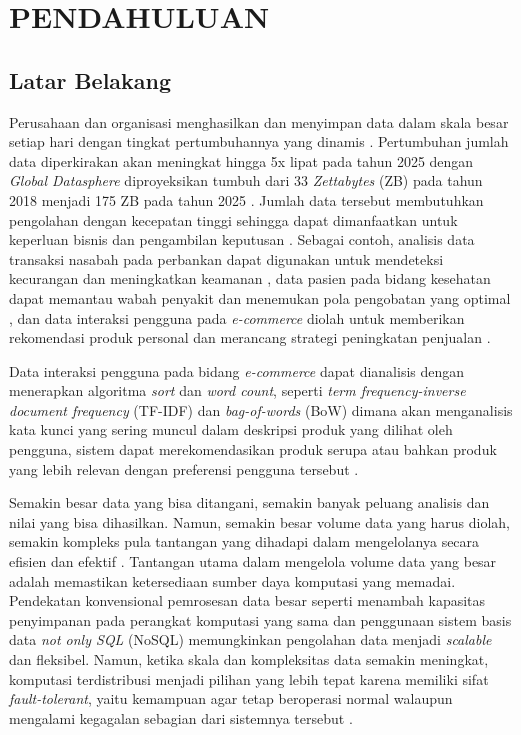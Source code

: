 \chapter{PENDAHULUAN}

\section{Latar Belakang}

Perusahaan dan organisasi menghasilkan dan menyimpan data dalam skala besar setiap hari dengan tingkat pertumbuhannya yang dinamis \cite{samadiPerformanceComparisonHadoop2018}. Pertumbuhan jumlah data diperkirakan akan meningkat hingga 5x lipat pada tahun 2025 dengan \textit{Global Datasphere} diproyeksikan tumbuh dari 33 \textit{Zettabytes} (ZB) pada tahun 2018 menjadi 175 ZB pada tahun 2025 \cite{reinselDigitizationWorldEdge2018}. Jumlah data tersebut membutuhkan pengolahan dengan kecepatan tinggi sehingga dapat dimanfaatkan untuk keperluan bisnis dan pengambilan keputusan \cite{adrianExpertReviewBig2018}. Sebagai contoh, analisis data transaksi nasabah pada perbankan dapat digunakan untuk mendeteksi kecurangan dan meningkatkan keamanan \cite{syahputraPendeteksianFraudPeran2020}, data pasien pada bidang kesehatan dapat memantau wabah penyakit dan menemukan pola pengobatan yang optimal \cite{sulaimanLITERATUREREVIEWPENERAPAN2023}, dan data interaksi pengguna pada \textit{e-commerce} diolah untuk memberikan rekomendasi produk personal dan merancang strategi peningkatan penjualan \cite{fernandoUtilizationBigData2020}. 

Data interaksi pengguna pada bidang \textit{e-commerce} dapat dianalisis dengan menerapkan algoritma \textit{sort} dan \textit{word count}, seperti \textit{term frequency-inverse document frequency} (TF-IDF) dan \textit{bag-of-words} (BoW) dimana akan menganalisis kata kunci yang sering muncul dalam deskripsi produk yang dilihat oleh pengguna, sistem dapat merekomendasikan produk serupa atau bahkan produk yang lebih relevan dengan preferensi pengguna tersebut \cite{shrivastavaProductRecommendationsUsing2019}.

Semakin besar data yang bisa ditangani, semakin banyak peluang analisis dan nilai yang bisa dihasilkan. Namun, semakin besar volume data yang harus diolah, semakin kompleks pula tantangan yang dihadapi dalam mengelolanya secara efisien dan efektif \cite{KOMPARASIKECEPATANHADOOP}. Tantangan utama dalam mengelola volume data yang besar adalah memastikan ketersediaan sumber daya komputasi yang memadai. Pendekatan konvensional pemrosesan data besar seperti menambah kapasitas penyimpanan pada perangkat komputasi yang sama dan penggunaan sistem basis data \textit{not only SQL} (NoSQL) memungkinkan pengolahan data menjadi \textit{scalable} dan fleksibel. Namun, ketika skala dan kompleksitas data semakin meningkat, komputasi terdistribusi menjadi pilihan yang lebih tepat karena memiliki sifat \textit{fault-tolerant}, yaitu kemampuan agar tetap beroperasi normal walaupun mengalami kegagalan sebagian dari sistemnya tersebut \cite{saadoonFaultToleranceBig2022}.

